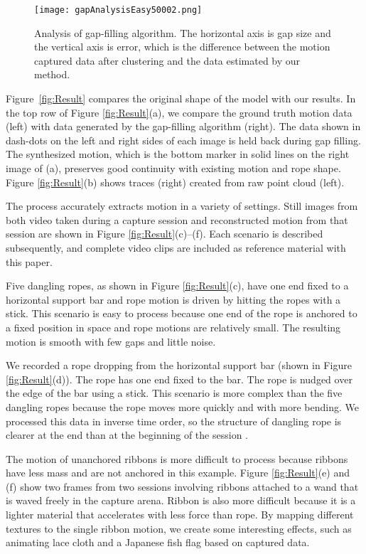 \begin{figure}[tb]
\texttt{[image: gapAnalysisEasy50002.png]}
\caption[Analysis of gap filling algorithm.]{Analysis of gap-filling algorithm. The horizontal axis is gap size and the vertical axis is error, which is the difference between the motion captured data after clustering and the data estimated by our method.}
\label{fig:gapFillAnalysis} 
\end{figure}

Figure~\ref{fig:Result} compares the original shape of the model with our results.  In the top row of Figure \ref{fig:Result}(a), we compare the ground truth motion data (left) with data generated by the gap-filling algorithm (right). The data shown in dash-dots on the left and right sides of each image is held back during gap filling. The synthesized motion, which is the bottom marker in solid lines on the right image of (a), preserves good continuity with existing motion and rope shape. Figure \ref{fig:Result}(b) shows traces (right) created from raw point cloud (left).

The process accurately extracts motion in a variety of settings.  Still images from both video taken during a capture session and reconstructed motion from that session are shown in Figure \ref{fig:Result}(c)--(f).  Each scenario is described subsequently, and complete video clips are included as reference material with this paper.

Five dangling ropes, as shown in Figure \ref{fig:Result}(c), have one end fixed to a horizontal support bar and rope motion is driven by hitting the ropes with a stick. This scenario is easy to process because one end of the rope is anchored to a fixed position in space and rope motions are relatively small. The resulting motion is smooth with few gaps and little noise.

We recorded a rope dropping from the horizontal support bar (shown in Figure \ref{fig:Result}(d)). The rope has one end fixed to the bar.  The rope is nudged over the edge of the bar using a stick.  This scenario is more complex than the five dangling ropes because the rope moves more quickly and with more bending.  We processed this data in inverse time order, so the structure of dangling rope is clearer at the end than at the beginning of the session . 

The motion of unanchored ribbons is more difficult to process because ribbons have less mass and are not anchored in this example.  Figure \ref{fig:Result}(e) and (f) show two frames from two sessions involving ribbons attached to a wand that is waved freely in the capture arena.  Ribbon is also more difficult because it is a lighter material that accelerates with less force than rope. By mapping different textures to the single ribbon motion, we create some interesting effects, such as animating lace cloth and a Japanese fish flag based on captured data.

